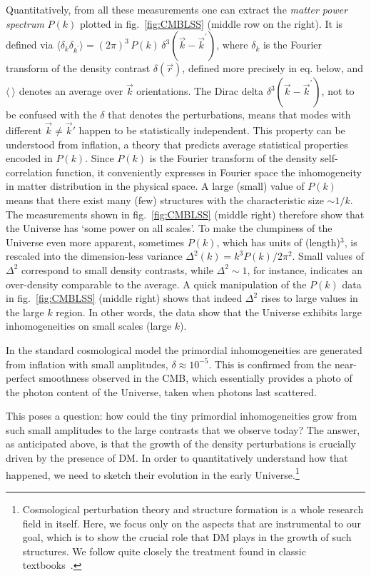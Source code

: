 Quantitatively, from all these measurements one can extract the {\em matter power spectrum} $P(k)$ plotted in fig.~\ref{fig:CMBLSS} (middle row on the right). It is defined via 
$\langle \delta_k \delta_{k^\prime} \rangle = (2 \pi)^3 \, P(k) \, \delta^3(\vec k- \vec k^\prime)$, where $\delta_k$ is the Fourier transform of the density contrast $\delta(\vec r)$, defined more precisely in eq. below, and $\langle \ \rangle$ denotes an average over $\vec k$ orientations.
The Dirac delta $\delta^3(\vec k- \vec k^\prime)$, not to be confused with the $\delta$ that denotes the perturbations, 
means that modes with different $\vec k \neq \vec k'$ happen to be statistically independent. This property can be understood from inflation, a theory that predicts average statistical properties encoded in $P(k)$.
Since $P(k)$ is the Fourier transform of the density self-correlation function, it conveniently expresses in Fourier space the inhomogeneity in matter distribution in the physical space. A large (small) value of $P(k)$ means that there exist many (few) structures with the characteristic size $\sim 1/k$. The measurements shown in fig.~\ref{fig:CMBLSS} (middle right) therefore show that the Universe has `some power on all scales'. 
To make the clumpiness of the Universe even more apparent, sometimes $P(k)$, which has units of (length)$^3$, is rescaled into the dimension-less  variance $\Delta^2(k) = k^3 P(k)/2 \pi^2$. 
Small values of $\Delta^2$ correspond to small density contrasts, while $\Delta^2 \sim 1$, for instance,  indicates an over-density comparable to the average. A quick manipulation of the $P(k)$ data in fig.~\ref{fig:CMBLSS} (middle right) shows that indeed $\Delta^2$ rises to large values in the large $k$ region. In other words, the data show that the Universe exhibits large inhomogeneities on small scales (large $k$).

In the standard cosmological model
the  primordial inhomogeneities are generated from inflation with  small amplitudes, $\delta \approx 10^{-5}$. 
This is confirmed from the near-perfect smoothness observed in the CMB, which essentially provides 
a photo of the photon content of the Universe, taken when photons last scattered.

This poses a question: how could the tiny primordial inhomogeneities
grow from such small amplitudes to the large contrasts that we observe today?
The answer, as anticipated above, is that the growth of the density perturbations is crucially driven by the presence of DM. In order to quantitatively understand how that happened, we need to sketch their evolution in the early Universe.\footnote{Cosmological perturbation theory and structure formation is a whole research field in itself. Here, we focus only on the aspects that are instrumental to our goal, which is to show the crucial role that DM plays in the growth of such structures. We follow quite closely the treatment found in classic textbooks~\cite{cosmobooks}.}

